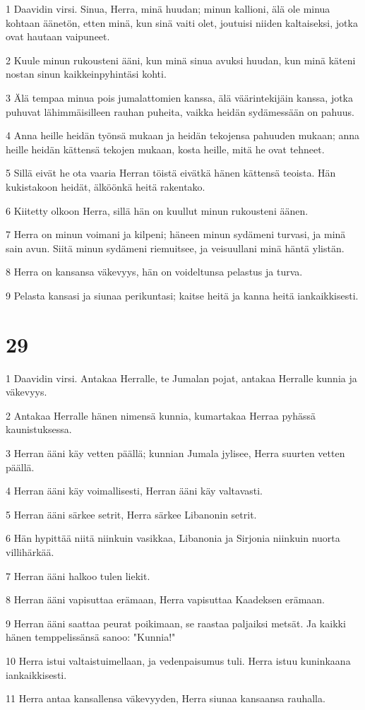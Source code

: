 \par 1 Daavidin virsi. Sinua, Herra, minä huudan; minun kallioni, älä ole minua kohtaan äänetön, etten minä, kun sinä vaiti olet, joutuisi niiden kaltaiseksi, jotka ovat hautaan vaipuneet.
\par 2 Kuule minun rukousteni ääni, kun minä sinua avuksi huudan, kun minä käteni nostan sinun kaikkeinpyhintäsi kohti.
\par 3 Älä tempaa minua pois jumalattomien kanssa, älä väärintekijäin kanssa, jotka puhuvat lähimmäisilleen rauhan puheita, vaikka heidän sydämessään on pahuus.
\par 4 Anna heille heidän työnsä mukaan ja heidän tekojensa pahuuden mukaan; anna heille heidän kättensä tekojen mukaan, kosta heille, mitä he ovat tehneet.
\par 5 Sillä eivät he ota vaaria Herran töistä eivätkä hänen kättensä teoista. Hän kukistakoon heidät, älköönkä heitä rakentako.
\par 6 Kiitetty olkoon Herra, sillä hän on kuullut minun rukousteni äänen.
\par 7 Herra on minun voimani ja kilpeni; häneen minun sydämeni turvasi, ja minä sain avun. Siitä minun sydämeni riemuitsee, ja veisuullani minä häntä ylistän.
\par 8 Herra on kansansa väkevyys, hän on voideltunsa pelastus ja turva.
\par 9 Pelasta kansasi ja siunaa perikuntasi; kaitse heitä ja kanna heitä iankaikkisesti.

\chapter{29}

\par 1 Daavidin virsi. Antakaa Herralle, te Jumalan pojat, antakaa Herralle kunnia ja väkevyys.
\par 2 Antakaa Herralle hänen nimensä kunnia, kumartakaa Herraa pyhässä kaunistuksessa.
\par 3 Herran ääni käy vetten päällä; kunnian Jumala jylisee, Herra suurten vetten päällä.
\par 4 Herran ääni käy voimallisesti, Herran ääni käy valtavasti.
\par 5 Herran ääni särkee setrit, Herra särkee Libanonin setrit.
\par 6 Hän hypittää niitä niinkuin vasikkaa, Libanonia ja Sirjonia niinkuin nuorta villihärkää.
\par 7 Herran ääni halkoo tulen liekit.
\par 8 Herran ääni vapisuttaa erämaan, Herra vapisuttaa Kaadeksen erämaan.
\par 9 Herran ääni saattaa peurat poikimaan, se raastaa paljaiksi metsät. Ja kaikki hänen temppelissänsä sanoo: "Kunnia!"
\par 10 Herra istui valtaistuimellaan, ja vedenpaisumus tuli. Herra istuu kuninkaana iankaikkisesti.
\par 11 Herra antaa kansallensa väkevyyden, Herra siunaa kansaansa rauhalla.

